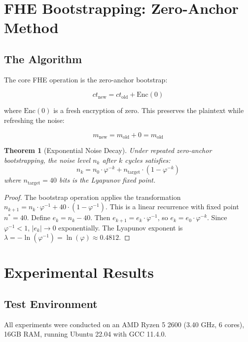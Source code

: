 \documentclass[11pt,a4paper]{article}
\newtheorem{theorem}{Theorem}[section]
\begin{document}
\section{FHE Bootstrapping: Zero-Anchor Method}

\subsection{The Algorithm}

The core FHE operation is the zero-anchor bootstrap:

\begin{equation}
ct_{\text{new}} = ct_{\text{old}} + \text{Enc}(0)
\end{equation}

where $\text{Enc}(0)$ is a fresh encryption of zero. This preserves the plaintext while refreshing the noise:

\begin{equation}
m_{\text{new}} = m_{\text{old}} + 0 = m_{\text{old}}
\end{equation}

\begin{theorem}[Exponential Noise Decay]
Under repeated zero-anchor bootstrapping, the noise level $n_k$ after $k$ cycles satisfies:
\begin{equation}
n_k = n_0 \cdot \varphi^{-k} + n_{\text{target}} \cdot (1 - \varphi^{-k})
\end{equation}
where $n_{\text{target}} = 40$ bits is the Lyapunov fixed point.
\end{theorem}

\begin{proof}
The bootstrap operation applies the transformation $n_{k+1} = n_k \cdot \varphi^{-1} + 40 \cdot (1 - \varphi^{-1})$. This is a linear recurrence with fixed point $n^* = 40$. Define $e_k = n_k - 40$. Then $e_{k+1} = e_k \cdot \varphi^{-1}$, so $e_k = e_0 \cdot \varphi^{-k}$. Since $\varphi^{-1} < 1$, $|e_k| \to 0$ exponentially. The Lyapunov exponent is $\lambda = -\ln(\varphi^{-1}) = \ln(\varphi) \approx 0.4812$.
\end{proof}

\section{Experimental Results}

\subsection{Test Environment}
All experiments were conducted on an AMD Ryzen 5 2600 (3.40 GHz, 6 cores), 16GB RAM, running Ubuntu 22.04 with GCC 11.4.0.
\end{document}
